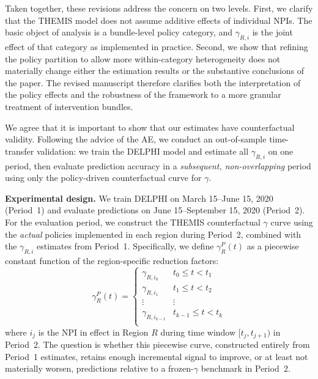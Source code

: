 \documentclass[letterpaper,twoside,11pt]{reviewresponse}
\begin{document}
Taken together, these revisions address the concern on two levels. First, we clarify that the THEMIS model does not assume additive effects of individual NPIs. The basic object of analysis is a bundle-level policy category, and $\gamma_{R,i}$ is the joint effect of that category as implemented in practice. Second, we show that refining the policy partition to allow more within-category heterogeneity does not materially change either the estimation results or the substantive conclusions of the paper. The revised manuscript therefore clarifies both the interpretation of the policy effects and the robustness of the framework to a more granular treatment of intervention bundles.

We agree that it is important to show that our estimates have counterfactual validity. Following the advice of the AE, we conduct an out-of-sample time-transfer validation: we train the DELPHI model and estimate all $\gamma_{R,i}$ on one period, then evaluate prediction accuracy in a \emph{subsequent, non-overlapping} period using only the policy-driven counterfactual curve for $\gamma$.
    
\textbf{Experimental design.} We train DELPHI on March 15--June 15, 2020 (Period~1) and evaluate predictions on June 15--September 15, 2020 (Period~2). For the evaluation period, we construct the THEMIS counterfactual $\gamma$ curve using the \emph{actual} policies implemented in each region during Period~2, combined with the $\gamma_{R,i}$ estimates from Period~1. Specifically, we define $\gamma_R^P(t)$ as a piecewise constant function of the region-specific reduction factors:
\begin{equation}
	\gamma_R^P(t)=\begin{cases}
		\gamma_{R,i_0} & t_0\leq t<t_1\\
		\gamma_{R,i_1} & t_1\leq t<t_2\\ 
		\vdots & \vdots \\
		\gamma_{R,i_{k-1}} & t_{k-1}\leq t<t_k\\ 
	\end{cases}
\end{equation}
where $i_j$ is the NPI in effect in Region $R$ during time window $[t_j, t_{j+1})$ in Period~2. The question is whether this piecewise curve, constructed entirely from Period~1 estimates, retains enough incremental signal to improve, or at least not materially worsen, predictions relative to a frozen-$\gamma$ benchmark in Period~2.
\end{document}
